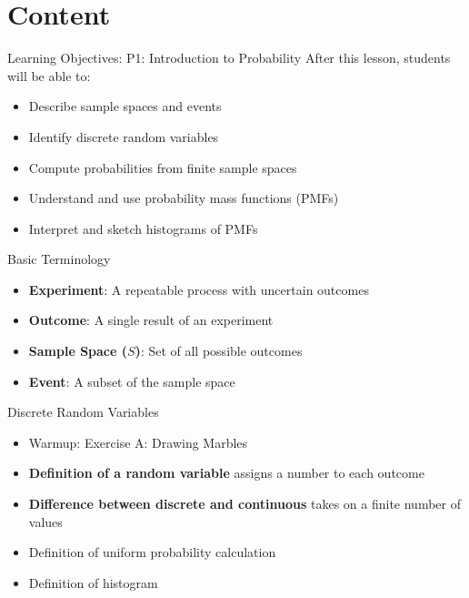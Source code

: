 \documentclass[dvipsnames]{beamer}
\newcommand{\transition}[1]{\frame{{}\begin{center}\fbox{#1}\end{center}}}
\begin{document}
\section{Content}

\transition{Content}




\begin{frame}{Learning Objectives: P1: Introduction to Probability }
After this lesson, students will be able to:
\begin{itemize}
    \item Describe sample spaces and events
    \item Identify discrete random variables
    \item Compute probabilities from finite sample spaces
    \item Understand and use probability mass functions (PMFs)
    \item Interpret and sketch histograms of PMFs
\end{itemize}
\end{frame}


\begin{frame}{Basic Terminology}
\begin{itemize}
    \item \textbf{Experiment}: A repeatable process with uncertain outcomes
    \item \textbf{Outcome}: A single result of an experiment
    \item \textbf{Sample Space ($S$)}: Set of all possible outcomes
    \item \textbf{Event}: A subset of the sample space
\end{itemize}
\end{frame}



\begin{frame}{Discrete Random Variables}
\begin{itemize}
    \item Warmup: Exercise A: Drawing Marbles
    \item \textbf{Definition of a random variable} assigns a number to each outcome
    \item \textbf{Difference between discrete and continuous} takes on a finite number of values
    \item Definition of uniform probability calculation
    \item Definition of histogram
\end{itemize}
\end{frame}
\end{document}
